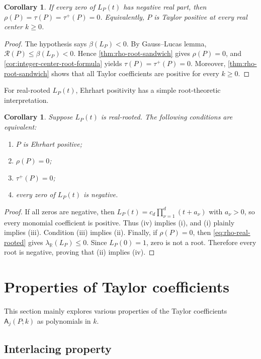 \documentclass[reqno, 12pt]{article}
\numberwithin{equation}{section}
\newtheorem{corollary}[theorem]{Corollary}
\theoremstyle{definition}
\newcommand{\R}{\mathbb{R}}
\newcommand{\A}{\mathsf{A}}
\begin{document}
\begin{corollary}\label{cor:left-half-plane}
If every zero of $L_P(t)$ has negative real part, then $\rho(P)=\tau(P)=\tau^+(P)=0$.
Equivalently, $P$ is Taylor positive at every real center $k\geq0$.
\end{corollary}
\begin{proof}
The hypothesis says $\beta(L_P)<0$. 
By Gauss–Lucas lemma, $\mathcal{R}(P) \leq \beta(L_P) < 0$. Hence \cref{thm:rho-root-sandwich} gives $\rho(P) = 0$, and \cref{cor:integer-center-root-formula} yields $\tau(P) = \tau^+(P) = 0$. Moreover, \cref{thm:rho-root-sandwich} shows that all Taylor coefficients are positive for every $k \geq 0$.
\end{proof}

For real-rooted $L_P(t)$, Ehrhart positivity has a simple root-theoretic interpretation.

\begin{corollary}\label{cor:real-rooted-equivalences}
Suppose $L_P(t)$ is real-rooted.  The following conditions are equivalent:
\begin{enumerate}
 \item[(i)] $P$ is Ehrhart positive;
 \item[(ii)] $\rho(P)=0$;
 \item[(iii)] $\tau^+(P)=0$;
 \item[(iv)] every zero of $L_P(t)$ is negative.
\end{enumerate}
\end{corollary}
\begin{proof}
If all zeros are negative, then $L_P(t)=c_d\prod_{\nu=1}^{d}(t+a_\nu)$ with $a_\nu>0$, so every monomial coefficient is positive.  Thus (iv) implies (i), and (i) plainly implies (iii).  Condition (iii) implies (ii).
Finally, if $\rho(P)=0$, then \eqref{eq:rho-real-rooted} gives $\lambda_{\R}(L_P)\leq0$.  Since $L_P(0)=1$, zero is not a root.
Therefore every root is negative, proving that (ii) implies (iv).
\end{proof}


\section{Properties of Taylor coefficients}\label{Section-Prop-Taylor}

This section mainly explores various properties of the Taylor coefficients $\A_{j}(P;k)$ as polynomials in $k$.

\subsection{Interlacing property}
\end{document}

